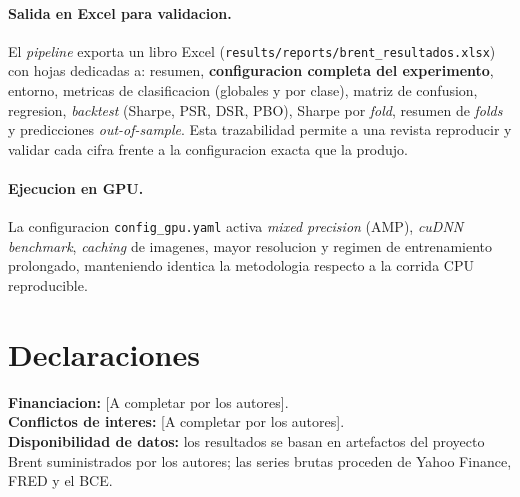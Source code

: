\documentclass[preprint,12pt,3p]{elsarticle}
\begin{document}
\paragraph{Salida en Excel para validacion.} El \emph{pipeline} exporta un libro
Excel (\texttt{results/reports/brent\_resultados.xlsx}) con hojas dedicadas a:
resumen, \textbf{configuracion completa del experimento}, entorno, metricas de
clasificacion (globales y por clase), matriz de confusion, regresion,
\emph{backtest} (Sharpe, PSR, DSR, PBO), Sharpe por \emph{fold}, resumen de
\emph{folds} y predicciones \emph{out-of-sample}. Esta trazabilidad permite a una
revista reproducir y validar cada cifra frente a la configuracion exacta que la
produjo.

\paragraph{Ejecucion en GPU.} La configuracion \texttt{config\_gpu.yaml} activa
\emph{mixed precision} (AMP), \emph{cuDNN benchmark}, \emph{caching} de imagenes,
mayor resolucion y regimen de entrenamiento prolongado, manteniendo identica la
metodologia respecto a la corrida CPU reproducible.

\section*{Declaraciones}
\textbf{Financiacion:} [A completar por los autores].\\
\textbf{Conflictos de interes:} [A completar por los autores].\\
\textbf{Disponibilidad de datos:} los resultados se basan en artefactos del
proyecto Brent suministrados por los autores; las series brutas proceden de Yahoo
Finance, FRED y el BCE.



\end{document}

